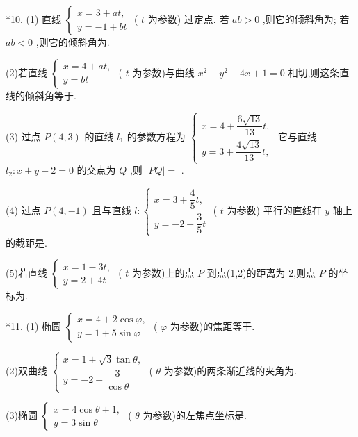 *10. (1) 直线 $\left\{  \begin{array}{l} x = 3 + {at}, \\  y =  - 1 + {bt} \end{array}\right.$ ( $t$ 为参数) 过定点\blkda{}. 若 ${ab} > 0$ ,则它的倾斜角为\blkda{}; 若 ${ab} < 0$ ,则它的倾斜角为\blkda{}.

(2)若直线 $\left\{  \begin{array}{l} x = 4 + {at}, \\  y = {bt} \end{array}\right.$ ( $t$ 为参数)与曲线 ${x}^{2} + {y}^{2} - {4x} + 1 = 0$ 相切,则这条直线的倾斜角等于\blkda{}.

(3) 过点 $P\left( {4,3}\right)$ 的直线 ${l}_{1}$ 的参数方程为 $\left\{  \begin{array}{l} x = 4 + \dfrac{6\sqrt{13}}{13}t, \\  y = 3 + \dfrac{4\sqrt{13}}{13}t, \end{array}\right.$ 它与直线 ${l}_{2} : x + y - 2 = 0$ 的交点为 $Q$ ,则 $\left| {PQ}\right|  =$ \blkda{}.

(4) 过点 $P\left( {4, - 1}\right)$ 且与直线 $l : \left\{  \begin{array}{l} x = 3 + \dfrac{4}{5}t, \\  y =  - 2 + \dfrac{3}{5}t \end{array}\right.$ ( $t$ 为参数) 平行的直线在 $y$ 轴上的截距是\blkda{}.

(5)若直线 $\left\{  \begin{array}{l} x = 1 - {3t}, \\  y = 2 + {4t} \end{array}\right.$ ( $t$ 为参数)上的点 $P$ 到点(1,2)的距离为 2,则点 $P$ 的坐标为\blkda{}.

*11. (1) 椭圆 $\left\{  \begin{array}{l} x = 4 + 2\cos \varphi , \\  y = 1 + 5\sin \varphi  \end{array}\right.$ ( $\varphi$ 为参数)的焦距等于\blkda{}.

(2)双曲线 $\left\{  \begin{array}{l} x = 1 + \sqrt{3}\tan \theta , \\  y =  - 2 + \dfrac{3}{\cos \theta } \end{array}\right.$ ( $\theta$ 为参数)的两条渐近线的夹角为\blkda{}.

(3)椭圆 $\left\{  \begin{array}{l} x = 4\cos \theta  + 1, \\  y = 3\sin \theta  \end{array}\right.$ ( $\theta$ 为参数)的左焦点坐标是\blkda{}.

